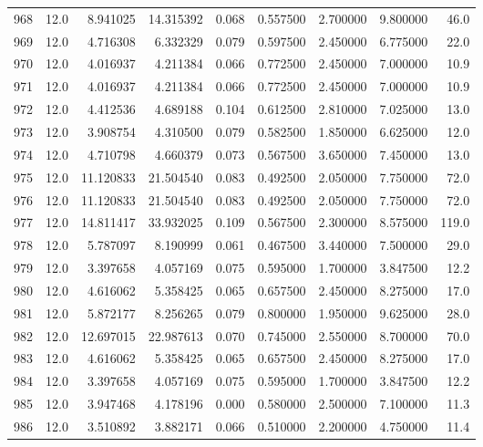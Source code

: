 \begin{tabular}{lrrrrrrrr}
968  &   12.0 &   8.941025 &  14.315392 &  0.068 &  0.557500 &  2.700000 &   9.800000 &   46.0 \\
969  &   12.0 &   4.716308 &   6.332329 &  0.079 &  0.597500 &  2.450000 &   6.775000 &   22.0 \\
970  &   12.0 &   4.016937 &   4.211384 &  0.066 &  0.772500 &  2.450000 &   7.000000 &   10.9 \\
971  &   12.0 &   4.016937 &   4.211384 &  0.066 &  0.772500 &  2.450000 &   7.000000 &   10.9 \\
972  &   12.0 &   4.412536 &   4.689188 &  0.104 &  0.612500 &  2.810000 &   7.025000 &   13.0 \\
973  &   12.0 &   3.908754 &   4.310500 &  0.079 &  0.582500 &  1.850000 &   6.625000 &   12.0 \\
974  &   12.0 &   4.710798 &   4.660379 &  0.073 &  0.567500 &  3.650000 &   7.450000 &   13.0 \\
975  &   12.0 &  11.120833 &  21.504540 &  0.083 &  0.492500 &  2.050000 &   7.750000 &   72.0 \\
976  &   12.0 &  11.120833 &  21.504540 &  0.083 &  0.492500 &  2.050000 &   7.750000 &   72.0 \\
977  &   12.0 &  14.811417 &  33.932025 &  0.109 &  0.567500 &  2.300000 &   8.575000 &  119.0 \\
978  &   12.0 &   5.787097 &   8.190999 &  0.061 &  0.467500 &  3.440000 &   7.500000 &   29.0 \\
979  &   12.0 &   3.397658 &   4.057169 &  0.075 &  0.595000 &  1.700000 &   3.847500 &   12.2 \\
980  &   12.0 &   4.616062 &   5.358425 &  0.065 &  0.657500 &  2.450000 &   8.275000 &   17.0 \\
981  &   12.0 &   5.872177 &   8.256265 &  0.079 &  0.800000 &  1.950000 &   9.625000 &   28.0 \\
982  &   12.0 &  12.697015 &  22.987613 &  0.070 &  0.745000 &  2.550000 &   8.700000 &   70.0 \\
983  &   12.0 &   4.616062 &   5.358425 &  0.065 &  0.657500 &  2.450000 &   8.275000 &   17.0 \\
984  &   12.0 &   3.397658 &   4.057169 &  0.075 &  0.595000 &  1.700000 &   3.847500 &   12.2 \\
985  &   12.0 &   3.947468 &   4.178196 &  0.000 &  0.580000 &  2.500000 &   7.100000 &   11.3 \\
986  &   12.0 &   3.510892 &   3.882171 &  0.066 &  0.510000 &  2.200000 &   4.750000 &   11.4 \\

\end{tabular}
